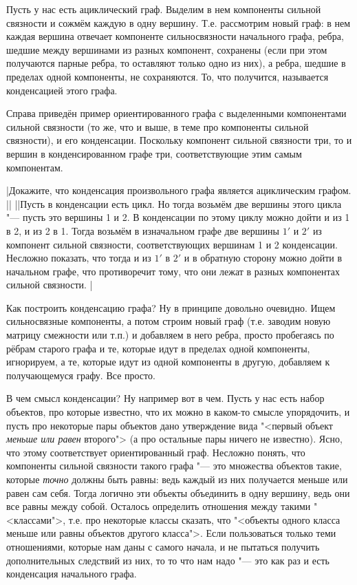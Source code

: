 Пусть у нас есть ациклический граф. Выделим в нем компоненты сильной связности и сожмём каждую в одну вершину. Т.е.
рассмотрим новый граф: в нем каждая вершина отвечает компоненте сильносвязности начального графа, ребра, шедшие между
вершинами из разных компонент, сохранены (если при этом получаются парные ребра, то оставляют только одно из них), а 
ребра, шедшие в пределах одной компоненты, не сохраняются. То, что получится, называется конденсацией этого графа. 
 
Справа приведён пример ориентированного графа с выделенными компонентами сильной связности
(то же, что и выше, в теме про компоненты сильной связности), и
его конденсации. Поскольку компонент сильной связности три, то и вершин в конденсированном графе три, 
соответствующие этим самым компонентам.

\task|Докажите, что конденсация произвольного графа является ациклическим графом.
||
||Пусть в конденсации есть цикл. Но тогда возьмём две вершины этого цикла "---
пусть это вершины 1 и 2. В конденсации по этому циклу можно дойти и из 1 в 2, и из 2 в 1. Тогда возьмём в изначальном графе 
две вершины $1'$ и $2'$ из компонент сильной связности, соответствующих вершинам 1 и 2 конденсации. Несложно показать,
что тогда и из $1'$ в $2'$ и в обратную сторону можно дойти в начальном графе, что противоречит тому,
что они лежат в разных компонентах сильной связности.
|\label{condensationisacyclic}

Как построить конденсацию графа? Ну в принципе довольно очевидно. Ищем сильносвязные компоненты, а потом строим новый 
граф (т.е. заводим новую матрицу смежности или т.п.) и добавляем в него ребра,
просто пробегаясь по рёбрам старого графа и те, которые идут в пределах одной компоненты, игнорируем, а те, которые 
идут из одной компоненты в другую, добавляем к получающемуся графу. Все просто.

В чем смысл конденсации? Ну например вот в чем. Пусть у нас есть набор объектов, про которые известно, что их можно
в каком-то смысле упорядочить, и пусть про некоторые пары объектов дано утверждение вида 
"<первый объект \textit{меньше или равен} второго"> (а про остальные пары ничего не известно). 
Ясно, что этому соответствует ориентированный граф. Несложно
понять, что компоненты сильной связности такого графа "--- это множества объектов такие, которые \textit{точно} должны
быть равны: ведь каждый из них получается меньше или равен сам себя. Тогда логично эти объекты объединить в одну вершину,
ведь они все равны между собой. Осталось определить отношения между такими "<классами">, т.е. про некоторые классы
сказать, что "<объекты одного класса меньше или равны объектов другого класса">. Если пользоваться только теми отношениями,
которые нам даны с самого начала, и не пытаться получить дополнительных следствий из них, то то что нам надо "---
это как раз и есть конденсация начального графа.

